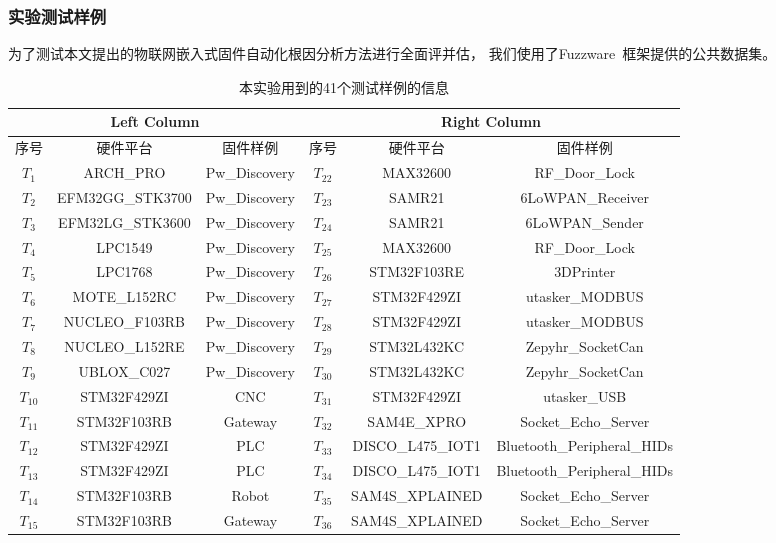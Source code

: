 \subsubsection{实验测试样例}
为了测试本文提出的物联网嵌入式固件自动化根因分析方法进行全面评并估，
我们使用了Fuzzware~\cite{Fuzzware}框架提供的公共数据集。
\begin{table}[h]\tiny
    \caption{本实验用到的41个测试样例的信息}
    \label{exp-0}
    \centering
    \begin{tabular}{@{}ccc|ccc@{}}\toprule
    \multicolumn{3}{c|}{\textbf{Left Column}} & \multicolumn{3}{c}{\textbf{Right Column}} \\ \midrule
    序号 & 硬件平台 & 固件样例 & 序号 & 硬件平台 & 固件样例 \\ \midrule
    $T_1$ & ARCH\_PRO & Pw\_Discovery & $T_{22}$ & MAX32600 & RF\_Door\_Lock \\
    $T_2$ & EFM32GG\_STK3700 & Pw\_Discovery & $T_{23}$ & SAMR21 & 6LoWPAN\_Receiver \\
    $T_3$ & EFM32LG\_STK3600 & Pw\_Discovery & $T_{24}$ & SAMR21 & 6LoWPAN\_Sender \\
    $T_4$ & LPC1549 & Pw\_Discovery & $T_{25}$ & MAX32600 & RF\_Door\_Lock \\
    $T_5$ & LPC1768 & Pw\_Discovery & $T_{26}$ & STM32F103RE & 3DPrinter \\
    $T_6$ & MOTE\_L152RC & Pw\_Discovery & $T_{27}$ & STM32F429ZI & utasker\_MODBUS \\
    $T_7$ & NUCLEO\_F103RB & Pw\_Discovery & $T_{28}$ & STM32F429ZI & utasker\_MODBUS \\
    $T_8$ & NUCLEO\_L152RE & Pw\_Discovery & $T_{29}$ & STM32L432KC & Zepyhr\_SocketCan \\
    $T_9$ & UBLOX\_C027 & Pw\_Discovery & $T_{30}$ & STM32L432KC & Zepyhr\_SocketCan \\
    $T_{10}$ & STM32F429ZI & CNC & $T_{31}$ & STM32F429ZI & utasker\_USB \\
    $T_{11}$ & STM32F103RB & Gateway & $T_{32}$ & SAM4E\_XPRO & Socket\_Echo\_Server \\
    $T_{12}$ & STM32F429ZI & PLC & $T_{33}$ & DISCO\_L475\_IOT1 & Bluetooth\_Peripheral\_HIDs \\
    $T_{13}$ & STM32F429ZI & PLC & $T_{34}$ & DISCO\_L475\_IOT1 & Bluetooth\_Peripheral\_HIDs \\
    $T_{14}$ & STM32F103RB & Robot & $T_{35}$ & SAM4S\_XPLAINED & Socket\_Echo\_Server \\
    $T_{15}$ & STM32F103RB & Gateway & $T_{36}$ & SAM4S\_XPLAINED & Socket\_Echo\_Server \\

\end{tabular}
\end{table}
